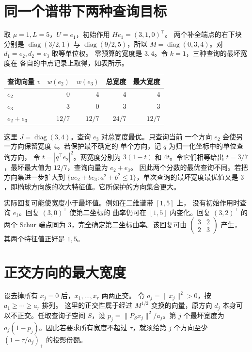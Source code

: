 \documentclass[UTF8,11pt,fontset=windows]{ctexart}
\newcommand{\diag}{\operatorname{diag}}
\begin{document}
\section{同一个谱带下两种查询目标}

取 \(\mu=1,L=5\)，\(U=e_1\)，初始作用 \(He_1=(3,1,0)^\top\)。
两个补全端点的右下块分别是
\(\diag(3/2,1)\) 与 \(\diag(9/2,5)\)，所以
\(M=\diag(0,3,4)\)。对 \(d_1=e_2,d_2=e_3\) 取等单位权。
零预算的宽度是 \(3,4\)。令 \(k=1\)，三种查询的最坏宽度在
各自的中点记录上取得，如表所示。

\begin{center}
\begin{tabular}{lrrrr}
\toprule
查询向量 \(v\) & \(w(e_2)\) & \(w(e_3)\) & 总宽度 & 最大宽度\\
\midrule
\(e_2\) & \(0\) & \(4\) & \(4\) & \(4\)\\
\(e_3\) & \(3\) & \(0\) & \(3\) & \(3\)\\
\(e_2+e_3\) & \(12/7\) & \(12/7\) & \(24/7\) & \(12/7\)\\
\bottomrule
\end{tabular}
\end{center}

这里 \(J=\diag(3,4)\)。查询 \(e_3\) 对总宽度最优。只查询当前
一个方向 \(e_2\) 会使另一方向保留宽度 \(4\)。若保护最不确定的
单个方向，记 \(q\) 为归一化坐标中的单位查询方向，
令 \(t=|q^\top e_2|^2\)。两宽度分别为 \(3(1-t)\) 和 \(4t\)。令它们相等给出
\(t=3/7\)，最坏最大值为 \(12/7\)，查询向量为 \(e_2+e_3\)。
因此两个分数的最优查询不同。若把方向集进一步扩大到
\(\{a e_2+b e_3:a^2+b^2\le1\}\)，单次查询的最坏宽度最优值又是
\(3\)，即椭球方向族的次大特征值。它所保护的方向集合更大。

实际回复可能使宽度小于最坏值。例如在二维谱带 \([1,5]\) 上，
没有初始作用时查询 \(e_1\)。回复 \((3,0)^\top\) 使第二坐标的
曲率仍可在 \([1,5]\) 内变化。回复 \((3,2)^\top\) 的两个 Schur
端点同为 \(3\)，完全确定第二坐标曲率。该回复可由
\(\left(\begin{smallmatrix}3&2\\2&3\end{smallmatrix}\right)\) 产生，
其两个特征值正好是 \(1,5\)。


\section{正交方向的最大宽度}

设去掉所有 \(x_j=0\) 后，\(x_1,\ldots,x_r\) 两两正交。
令 \(a_j=\|x_j\|^2>0\)，按 \(a_1\ge\cdots\ge a_r\) 排列。
这里的正交性属于经过 \(M^{1/2}\) 变换的向量，原方向 \(d_j\)
本身可以不正交。任取查询子空间 \(S\)，设
\(p_j=\|P_Sx_j\|^2/a_j\)。第 \(j\) 个最坏宽度为
\(a_j(1-p_j)\)。因此若要求所有宽度不超过 \(\tau\)，就须给第
\(j\) 个方向至少 \((1-\tau/a_j)_+\) 的投影份额。
\end{document}
